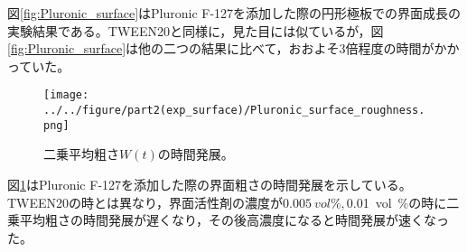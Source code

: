 \documentclass[autodetect-engine,dvi=dvipdfmx,a4paper,ja=standard,oneside,openany,11pt]{bxjsbook}
\begin{document}
図\ref{fig:Pluronic_surface}はPluronic F-127を添加した際の円形極板での界面成長の実験結果である。TWEEN20と同様に，見た目には似ているが，図\ref{fig:Pluronic_surface}は他の二つの結果に比べて，おおよそ3倍程度の時間がかかっていた。

\begin{figure}[htbp]
  \centering
  \texttt{[image: ../../figure/part2(exp\_surface)/Pluronic\_surface\_roughness.png]}
  \caption{二乗平均粗さ$W(t)$の時間発展。}
  \label{fig:surface_roughness_Pluronic}
\end{figure}

図\ref{fig:surface_roughness_Pluronic}はPluronic F-127を添加した際の界面粗さの時間発展を示している。TWEEN20の時とは異なり，界面活性剤の濃度が$\SI{0.005}{vol\%}, $\SI{0.01}{vol\%}の時に二乗平均粗さの時間発展が遅くなり，その後高濃度になると時間発展が速くなった。

\ifdraft{
  
  
}{}
\end{document}
